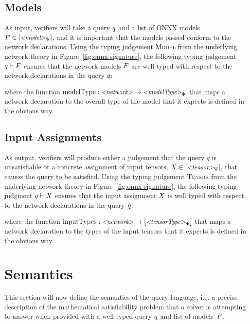 \subsection{Models}
\label{sec:model-typing}

As input, verifiers will take a query $q$ and a list of ONNX models $F \in [\text{\small \textit{<model>}}_\Psi]$, and it is important that the models passed conform to the network declarations. 
Using the typing judgement \textsc{Model} from the underlying network theory in Figure~\ref{fig:onnx-signature}, the following typing judgement $q \vdash F$ ensures that the network models $F$ are well typed with respect to the network declarations in the query $q$:

where the function $\text{modelType} : \text{\small \textit{<network>}} \rightarrow \text{\small \textit{<modelType>}}_\Psi$ that maps a network declaration to the overall type of the model that it expects is defined in the obvious way.

\subsection{Input Assignments}
\label{sec:input-assignment-typing}

As output, verifiers will produce either a judgement that the query $q$ is unsatisfiable or a concrete assignment of input tensors, $X \in [\text{\small \textit{<tensor>}}_\Psi]$, that causes the query to be satisfied. 
Using the typing judgement \textsc{Tensor} from the underlying network theory in Figure~\ref{fig:onnx-signature}, the following typing judgment $q \vdash X$ ensures that the input assignment $X$ is well typed with respect to the network declarations in the query~$q$:

where the function $\text{inputTypes} : \text{\small \textit{<network>}} \rightarrow [\text{\small \textit{<tensorType>}}_\Psi]$ that maps a network declaration to the types of the input tensors that it expects is defined in the obvious way.

\section{Semantics}
\label{sec:semantics}

This section will now define the semantics of the \vnnlib{} query language, i.e. a precise description of the mathematical satisfiability problem that a solver is attempting to answer when provided with a well-typed query $q$ and list of models~$F$.


